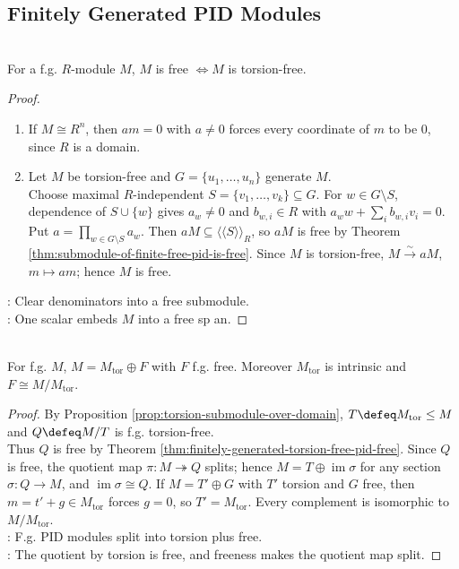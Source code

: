 \subsection{Finitely Generated PID Modules}

\begin{theorem} \label{thm:finitely-generated-torsion-free-pid-free} \\
For a f.g. $R$-module $M$, $M$ is free $\iff M$ is torsion-free.
\begin{proof}
\begin{enumerate}[label=\roman*.]
\setlength{\itemsep}{0pt}
\item[$(\Rightarrow)$] If $M\cong R^n$, then $am=0$ with $a\neq0$ forces every coordinate of $m$ to be $0$, since $R$ is a domain.
\item[$(\Leftarrow)$] Let $M$ be torsion-free and $G=\{u_1,\ldots,u_n\}$ generate $M$.\\
Choose maximal $R$-independent $S=\{v_1,\ldots,v_k\}\subseteq G$. For $w\in G\setminus S$, dependence of $S\cup\{w\}$ gives $a_w\neq0$ and $b_{w,i}\in R$ with $a_ww+\sum\limits_i b_{w,i}v_i=0$. Put $a=\prod_{w\in G\setminus S}a_w$. Then $aM\subseteq\langle\!\langle S\rangle\!\rangle_R$, so $aM$ is free by Theorem \ref{thm:submodule-of-finite-free-pid-is-free}. Since $M$ is torsion-free, $M\xrightarrow{\sim}aM$, $m\mapsto am$; hence $M$ is free.
\end{enumerate}
\noindent
{}: Clear denominators into a free submodule.\\
: One scalar embeds $M$ into a free sp	an.
\end{proof}
\end{theorem}

\begin{theorem} \label{thm:finitely-generated-pid-free-plus-torsion} \\
For f.g. $M$, $M=M_{\operatorname{tor}}\oplus F$ with $F$ f.g. free. Moreover $M_{\operatorname{tor}}$ is intrinsic and $F\cong M/M_{\operatorname{tor}}$.
\begin{proof} By Proposition \ref{prop:torsion-submodule-over-domain}, $T\defeq M_{\operatorname{tor}}\leq M$ and $Q\defeq M/T$ is f.g. torsion-free.\\
Thus $Q$ is free by Theorem \ref{thm:finitely-generated-torsion-free-pid-free}. Since $Q$ is free, the quotient map $\pi:M\twoheadrightarrow Q$ splits; hence $M=T\oplus\operatorname{im}\sigma$ for any section $\sigma:Q\to M$, and $\operatorname{im}\sigma\cong Q$. If $M=T'\oplus G$ with $T'$ torsion and $G$ free, then $m=t'+g\in M_{\operatorname{tor}}$ forces $g=0$, so $T'=M_{\operatorname{tor}}$. Every complement is isomorphic to $M/M_{\operatorname{tor}}$.\\
: F.g. PID modules split into torsion plus free.\\
: The quotient by torsion is free, and freeness makes the quotient map split.
\end{proof}
\end{theorem}

